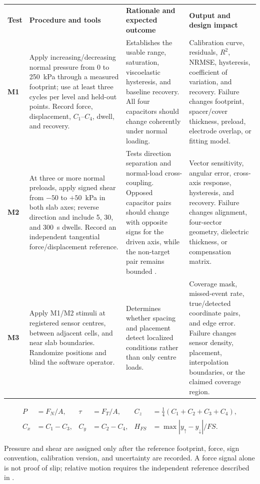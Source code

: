 \vspace{0.35em}
\begingroup
\fontsize{7.65}{8.95}\selectfont
\setlength{\tabcolsep}{2.6pt}\renewcommand{\arraystretch}{1.04}
\begin{tabularx}{\linewidth}{>{\raggedright\arraybackslash\bfseries\color{AUBRed}}p{1.0cm}Y Y Y}
\color{white}\textbf{Test} & \color{white}\textbf{Procedure and tools} &
\color{white}\textbf{Rationale and expected outcome} &
\color{white}\textbf{Output and design impact} \\
M1 & Apply increasing/decreasing normal pressure from 0 to 250~kPa through a
measured footprint; use at least three cycles per level and held-out points.
Record force, displacement, $C_1$--$C_4$, dwell, and recovery. & Establishes
the usable range, saturation, viscoelastic hysteresis, and baseline recovery.
All four capacitors should change coherently under normal loading. & Calibration
curve, residuals, $R^2$, NRMSE, hysteresis, coefficient of variation, and
recovery. Failure changes footprint, spacer/cover thickness, preload,
electrode overlap, or fitting model. \\
M2 & At three or more normal preloads, apply signed shear from $-50$ to
$+50$~kPa in both slab axes; reverse direction and include 5, 30, and 300~s
dwells. Record an independent tangential force/displacement reference. & Tests
direction separation and normal-load cross-coupling. Opposed capacitor pairs
should change with opposite signs for the driven axis, while the non-target
pair remains bounded \cite{albrecht2019}. & Vector sensitivity, angular error,
cross-axis response, hysteresis, and recovery. Failure changes alignment,
four-sector geometry, dielectric thickness, or compensation matrix. \\
M3 & Apply M1/M2 stimuli at registered sensor centres, between adjacent cells,
and near slab boundaries. Randomize positions and blind the software operator.
& Determines whether spacing and placement detect localized conditions rather
than only centre loads. & Coverage mask, missed-event rate, true/detected
coordinate pairs, and edge error. Failure changes sensor density, placement,
interpolation boundaries, or the claimed coverage region. \\
\end{tabularx}
\endgroup

\vspace{0.35em}
\begin{align*}
P&=F_N/A, & \tau&=F_T/A, &
C_z&=\tfrac14(C_1+C_2+C_3+C_4),\\[-0.3em]
C_x&=C_1-C_3, & C_y&=C_2-C_4, &
H_{FS}&=\max|y_{\uparrow}-y_{\downarrow}|/FS.
\end{align*}
{\fontsize{7.45}{8.6}\selectfont\color{AUBGray}
Pressure and shear are assigned only after the reference footprint, force,
sign convention, calibration version, and uncertainty are recorded. A force
signal alone is not proof of slip; relative motion requires the independent
reference described in 
\cite{q3tang2022,noll2018}.\par}

